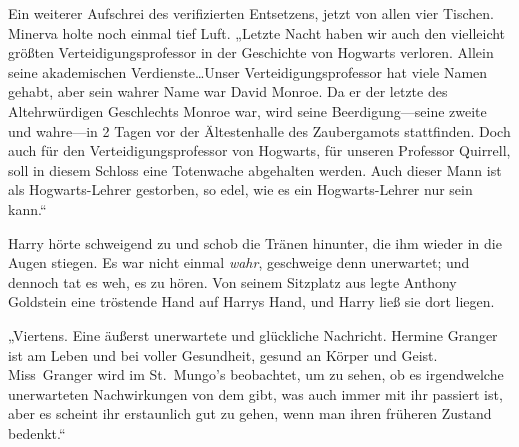 Ein weiterer Aufschrei des verifizierten Entsetzens, jetzt von allen vier Tischen.
Minerva holte noch einmal tief Luft.
„Letzte Nacht haben wir auch den vielleicht größten Verteidigungsprofessor in der Geschichte von Hogwarts verloren. Allein seine akademischen Verdienste…Unser Verteidigungsprofessor hat viele Namen gehabt, aber sein wahrer Name war David Monroe. Da er der letzte des Altehrwürdigen Geschlechts Monroe war, wird seine Beerdigung—seine zweite und wahre—in 2 Tagen vor der Ältestenhalle des Zaubergamots stattfinden. Doch auch für den Verteidigungsprofessor von Hogwarts, für unseren Professor Quirrell, soll in diesem Schloss eine Totenwache abgehalten werden. Auch dieser Mann ist als Hogwarts-Lehrer gestorben, so edel, wie es ein Hogwarts-Lehrer nur sein kann.“

Harry hörte schweigend zu und schob die Tränen hinunter, die ihm wieder in die Augen stiegen. Es war nicht einmal \emph{wahr}, geschweige denn unerwartet; und dennoch tat es weh, es zu hören.
Von seinem Sitzplatz aus legte Anthony Goldstein eine tröstende Hand auf Harrys Hand, und Harry ließ sie dort liegen.

„Viertens. Eine äußerst unerwartete und glückliche Nachricht. Hermine Granger ist am Leben und bei voller Gesundheit, gesund an Körper und Geist. Miss~Granger wird im St.~Mungo’s beobachtet, um zu sehen, ob es irgendwelche unerwarteten Nachwirkungen von dem gibt, was auch immer mit ihr passiert ist, aber es scheint ihr erstaunlich gut zu gehen, wenn man ihren früheren Zustand bedenkt.“

